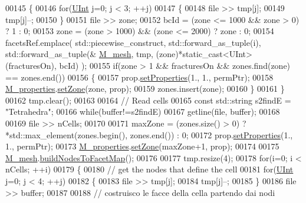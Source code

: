 \begin{DoxyCode}
00145     \{
00146         \textcolor{keywordflow}{for}(\hyperlink{namespaceFVCode3D_a4bf7e328c75d0fd504050d040ebe9eda}{UInt} j=0; j < 3; ++j)
00147         \{
00148             file >> tmp[j];
00149             tmp[j]--;
00150         \}
00151         file >> zone;
00152         bcId = (zone <= 1000 && zone > 0) ? 1 : 0;
00153         zone = (zone > 1000) && (zone <= 2000) ? zone : 0;
00154         facetsRef.emplace( std::piecewise\_construct, std::forward\_as\_tuple(i), std::forward\_as\_tuple(&
      \hyperlink{classFVCode3D_1_1Importer_a6f1542d6c6ac192e36c8eec7dc366653}{M\_mesh}, tmp, (zone)*static\_cast<UInt>(fracturesOn), bcId) );
00155         \textcolor{keywordflow}{if}(zone > 1 && fracturesOn && zones.find(zone) == zones.end())
00156         \{
00157             prop.\hyperlink{classFVCode3D_1_1Properties_a0ddb477254cfacdb96a440ddedc2548c}{setProperties}(1., 1., permPtr);
00158             \hyperlink{classFVCode3D_1_1Importer_af678e18e971d5a132f5ba494981f6dae}{M\_properties}.\hyperlink{classFVCode3D_1_1PropertiesMap_ac303adadd1101e7bee62ecad0e8ea6ac}{setZone}(zone, prop);
00159             zones.insert(zone);
00160         \}
00161     \}
00162     tmp.clear();
00163 
00164     \textcolor{comment}{// Read cells}
00165     \textcolor{keyword}{const} std::string s2findE = \textcolor{stringliteral}{"Tetrahedra"};
00166     \textcolor{keywordflow}{while}(buffer!=s2findE)
00167         getline(file, buffer);
00168 
00169     file >> nCells;
00170 
00171     maxZone = (zones.size() > 0) ? *std::max\_element(zones.begin(), zones.end()) : 0;
00172     prop.\hyperlink{classFVCode3D_1_1Properties_a0ddb477254cfacdb96a440ddedc2548c}{setProperties}(1., 1., permPtr);
00173     \hyperlink{classFVCode3D_1_1Importer_af678e18e971d5a132f5ba494981f6dae}{M\_properties}.\hyperlink{classFVCode3D_1_1PropertiesMap_ac303adadd1101e7bee62ecad0e8ea6ac}{setZone}(maxZone+1, prop);
00174 
00175     \hyperlink{classFVCode3D_1_1Importer_a6f1542d6c6ac192e36c8eec7dc366653}{M\_mesh}.\hyperlink{classFVCode3D_1_1Mesh3D_a609f980329f5a98e9fad724049e509d2}{buildNodesToFacetMap}();
00176 
00177     tmp.resize(4);
00178     \textcolor{keywordflow}{for}(i=0; i < nCells; ++i)
00179     \{
00180         \textcolor{comment}{// get the nodes that define the cell}
00181         \textcolor{keywordflow}{for}(\hyperlink{namespaceFVCode3D_a4bf7e328c75d0fd504050d040ebe9eda}{UInt} j=0; j < 4; ++j)
00182         \{
00183             file >> tmp[j];
00184             tmp[j]--;
00185         \}
00186         file >> buffer;
00187 
00188         \textcolor{comment}{// costruisco le facce della cella partendo dai nodi}

\end{DoxyCode}
